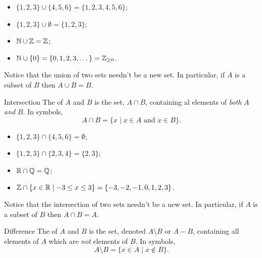 \documentclass[fleqn]{LectureClass/LectureClass}
\begin{document}
    \begin{exm}{}{}
        \begin{itemize}
            \item \(\{1, 2, 3\} \cup \{4, 5, 6\} = \{1, 2, 3, 4, 5, 6\}\);
            \item \(\{1, 2, 3\} \cup \emptyset = \{1, 2, 3\}\);
            \item \(\mathbb{N} \cup \mathbb{Z} = \mathbb{Z}\);
            \item \(\mathbb{N} \cup \{0\} = \{0, 1, 2, 3, \dotsc\} = \mathbb{Z}_{\ge 0}\).
        \end{itemize}
    \end{exm}
    
    Notice that the union of two sets needn't be a new set.
    In particular, if \(A\) is a subset of \(B\) then \(A \cup B = B\).
    
    \begin{dfn}{Intersection}{}
        The  of \(A\) and \(B\) is the set, \(A \cap B\), containing al elements of \emph{both} \(A\) \emph{and} \(B\).
        In symbols,
        \begin{equation}
            A \cap B = \{x \mid x \in A \text{ and } x \in B\}.
        \end{equation}
    \end{dfn}
    
    \begin{exm}{}{}
        \begin{itemize}
            \item \(\{1, 2, 3\} \cap \{4, 5, 6\} = \emptyset\);
            \item \(\{1, 2, 3\} \cap \{2, 3, 4\} = \{2, 3\}\);
            \item \(\mathbb{R} \cap \mathbb{Q} = \mathbb{Q}\);
            \item \(\mathbb{Z} \cap \{x \in \mathbb{R} \mid -3 \le x \le 3\} = \{-3, -2, -1, 0, 1, 2, 3\}\).
        \end{itemize}
    \end{exm}
    
    Notice that the intersection of two sets needn't be a new set.
    In particular, if \(A\) is a subset of \(B\) then \(A \cap B = A\).
    
    \begin{dfn}{Difference}{}
        The  of \(A\) and \(B\) is the set, denoted \(A \setminus B\) or \(A - B\), containing all elements of \(A\) which are \emph{not} elements of \(B\).
        In symbols,
        \begin{equation}
            A \setminus B = \{x \in A \mid x \notin B\}.
        \end{equation}
    \end{dfn}
    
\end{document}
